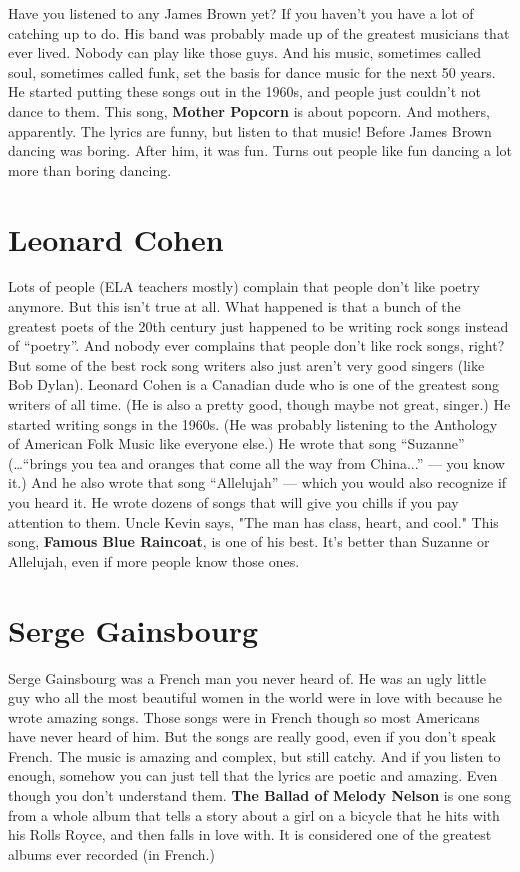 \documentclass[letterpaper,12pt,single]{article}
\begin{document}
Have you listened to any James Brown yet? If you haven't you have a lot of catching up to do. His band was probably made up of the greatest musicians that ever lived. 
Nobody can play like those guys. 
And his music, sometimes called soul, sometimes called funk, set the basis for dance music for the next 50 years. 
He started putting these songs out in the 1960s, and people just couldn't not dance to them. 
This song, \textbf{Mother Popcorn} is about popcorn. And mothers, apparently.
The lyrics are funny, but listen to that music! 
Before James Brown dancing was boring. After him, it was fun. Turns out people like fun dancing a lot more than boring dancing.

\section{Leonard Cohen}

Lots of people (ELA teachers mostly) complain that people don't like poetry anymore. 
But this isn't true at all. 
What happened is that a bunch of the greatest poets of the 20th century just happened to be writing rock songs instead of ``poetry''. 
And nobody ever complains that people don't like rock songs, right? 
But some of the best rock song writers also just aren't very good singers (like Bob Dylan). 
Leonard Cohen is a Canadian dude who is one of the greatest song writers of all time. 
(He is also a pretty good, though maybe not great, singer.) 
He started writing songs in the 1960s. 
(He was probably listening to the Anthology of American Folk Music like everyone else.) 
He wrote that song ``Suzanne'' (\ldots``brings you tea and oranges that come all the way from China...'' --- you know it.) 
And he also wrote that song ``Allelujah'' --- which you would also recognize if you heard it. 
He wrote dozens of songs that will give you chills if you pay attention to them. 
Uncle Kevin says, "The man has class, heart, and cool." 
This song, \textbf{Famous Blue Raincoat}, is one of his best. 
It's better than Suzanne or Allelujah, even if more people know those ones.

\section{Serge Gainsbourg}

Serge Gainsbourg was a French man you never heard of. 
He was an ugly little guy who all the most beautiful women in the world were in love with because he wrote amazing songs. 
Those songs were in French though so most Americans have never heard of him. 
But the songs are really good, even if you don't speak French. 
The music is amazing and complex, but still catchy.
And if you listen to enough, somehow you can just tell that the lyrics are poetic and amazing.
Even though you don't understand them.
\textbf{The Ballad of Melody Nelson} is one song from a whole album that tells a story about a girl on a bicycle that he hits with his Rolls Royce, and then falls in love with. 
It is considered one of the greatest albums ever recorded (in French.)
\end{document}
